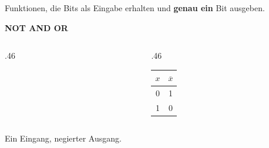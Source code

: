 \begin{frame}
\begin{center}
Funktionen, die Bits als Eingabe erhalten und \textbf{genau ein} Bit ausgeben.
\end{center}
\vspace{4mm}
\begin{center}
\Large\bfseries\color{FDUteal}NOT \quad AND \quad OR
\end{center}
\end{frame}

\begin{frame}
\begin{columns}[c,onlytextwidth]
\begin{column}{.46\textwidth}
\end{column}
\begin{column}{.46\textwidth}
\begin{tabular}{c||c}
    $x$ & $\overline{x}$ \\\midrule\midrule
    0 & 1 \\\midrule
    1 & 0 \\
\end{tabular}
\end{column}
\end{columns}
\vspace{3mm}
\begin{center}Ein Eingang, negierter Ausgang.\end{center}
\end{frame}

